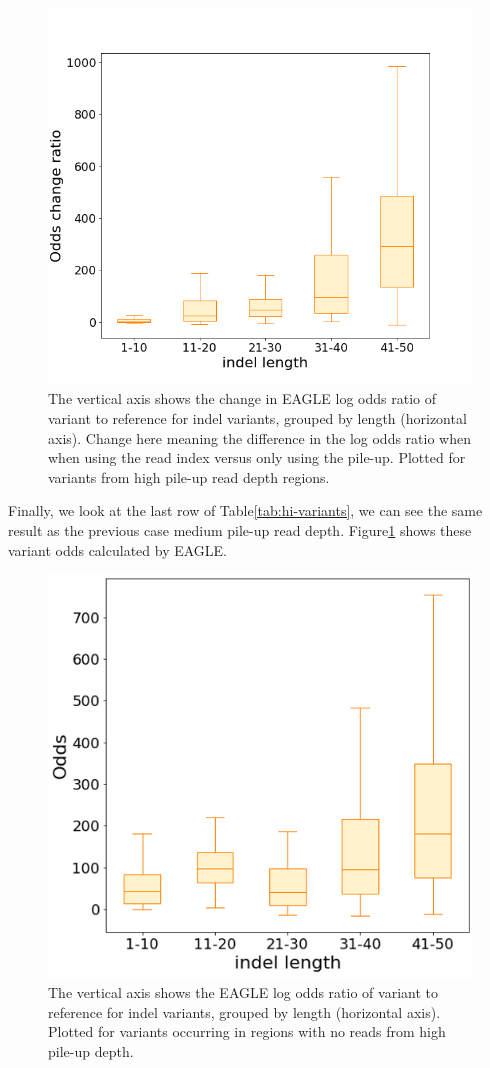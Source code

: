 \begin{figure}[H]
\centering
\includegraphics[width=0.6\columnwidth]{body/image/hi_odds_change.png}
\caption[high pile-up read depth odds change ratio]{The vertical axis shows the change in EAGLE log odds ratio of variant to reference for indel variants, grouped by length (horizontal axis).  Change here meaning the difference in the log odds ratio when when using the read index versus only using the pile-up.  Plotted for variants from high pile-up read depth regions.}
\label{hi_odds_change}
\end{figure}

Finally, we look at the last row of Table\ref{tab:hi-variants}, we can see the same result as the previous case medium pile-up read depth. Figure\ref{hi_odds_change} shows these variant odds calculated by EAGLE.

\begin{figure}[H]
\centering
\includegraphics[width=0.6\columnwidth]{body/image/hi_new_odds.png}
\caption[no reads with variants from high pile-up depth odds ratio]{The vertical axis shows the EAGLE log odds ratio of variant to reference for indel variants, grouped by length (horizontal axis).  Plotted for variants occurring in regions with no reads from high pile-up depth.}
\label{hi_new_odds}
\end{figure}


